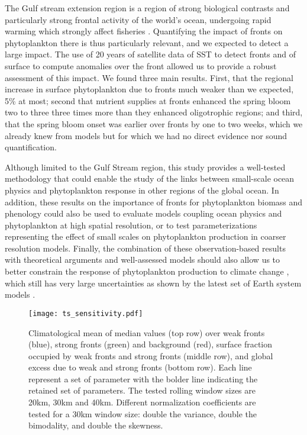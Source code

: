 \conclusions{}

The Gulf stream extension region is a region of strong biological contrasts and particularly strong frontal activity of the world's ocean, undergoing rapid warming which strongly affect fisheries \citep{pershing_2015, neto_2021}.
Quantifying the impact of fronts on phytoplankton there is thus particularly relevant, and we expected to detect a large impact.
The use of 20 years of satellite data of SST to detect fronts and of surface  to compute anomalies over the front allowed us to provide a robust assessment of this impact.
We found three main results.
First, that the regional increase in surface phytoplankton due to fronts much weaker than we expected, 5\% at most; second that nutrient supplies at fronts enhanced the spring bloom two to three three times more than they enhanced oligotrophic regions; and third, that the spring bloom onset was earlier over fronts by one to two weeks, which we already knew from models \citep{karleskind_2011, mahadevan_2012} but for which we had no direct evidence nor sound quantification.

Although limited to the Gulf Stream region, this study provides a well-tested methodology that could enable the study of the links between small-scale ocean physics and phytoplankton response in other regions of the global ocean.
In addition, these results on the importance of fronts for phytoplankton biomass and phenology could also be used to evaluate models coupling ocean physics and phytoplankton at high spatial resolution, or to test parameterizations representing the effect of small scales on phytoplankton production in coarser resolution models.
Finally, the combination of these observation-based results with theoretical arguments and well-assessed models should also allow us to better constrain the response of phytoplankton production to climate change \citep{couespel_2021}, which still has very large uncertainties as shown by the latest set of Earth system models \citep{kwiatkowski_2020}.



\appendixfigures{}

\begin{figure*}
 \texttt{[image: ts\_sensitivity.pdf]}
 \caption{
   Climatological mean of  median values (top row) over weak fronts (blue), strong fronts (green) and background (red), surface fraction occupied by weak fronts and strong fronts (middle row), and global  excess due to weak and strong fronts (bottom row).
   Each line represent a set of parameter with the bolder line indicating the retained set of parameters.
   The tested rolling window sizes are 20km, 30km and 40km.
   Different normalization coefficients are tested for a 30km window size: double the variance, double the bimodality, and double the skewness.
 }%
 \label{fig:ts-sensitivity}
\end{figure*}



